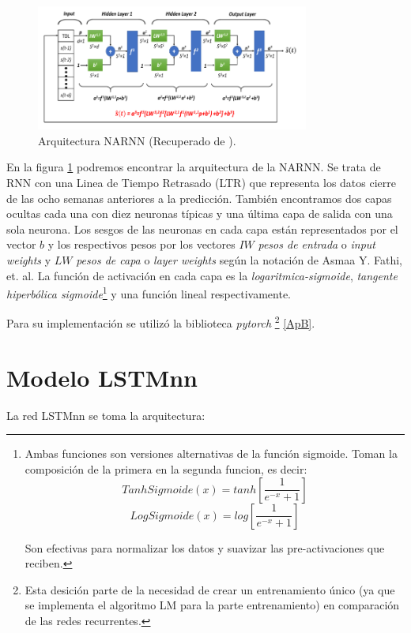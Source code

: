 \begin{figure}[H]
    \centering
    \includegraphics[width=0.8\textwidth]{Figuras/construccion_del_modelo/DWT-NARRN.png}
    \caption{Arquitectura NARNN (Recuperado de \cite{DWT-NARNN}).} 
    \label{fig:arquitectura_NARNN}
\end{figure}

En la figura \ref{fig:arquitectura_NARNN} podremos encontrar la arquitectura de la NARNN. Se trata de RNN con una Linea de Tiempo Retrasado (LTR) que representa los datos cierre de las ocho semanas anteriores a la predicción. También encontramos dos capas ocultas cada una con diez neuronas típicas y una última capa de salida con una sola neurona. Los sesgos de las neuronas en cada capa están representados por el vector $b$ y los respectivos pesos por los vectores $IW$ \textit{pesos de entrada} o \textit{input weights} y $LW$ \textit{pesos de capa} o \textit{layer weights} según la notación de Asmaa Y. Fathi, et. al. La función de activación en cada capa es la \textit{logaritmica-sigmoide}, \textit{tangente hiperbólica sigmoide}\footnote{Ambas funciones son versiones alternativas de la función sigmoide. Toman la composición de la primera en la segunda funcion, es decir:
\[
TanhSigmoide(x) = tanh\left[\dfrac{1}{e^{-x} + 1}\right]
\]\[
LogSigmoide(x) =log\left[\dfrac{1}{e^{-x} + 1}\right]
\]

Son efectivas para normalizar los datos y suavizar las pre-activaciones que reciben.
} y una función lineal respectivamente.

Para su implementación se utilizó la biblioteca \textit{pytorch} \footnote{Esta desición parte de la necesidad de crear un entrenamiento único (ya que se implementa el algoritmo LM para la parte entrenamiento) en comparación de las redes recurrentes.} \ref{ApB}.


\section{Modelo LSTMnn}

La red LSTMnn se toma la arquitectura:

